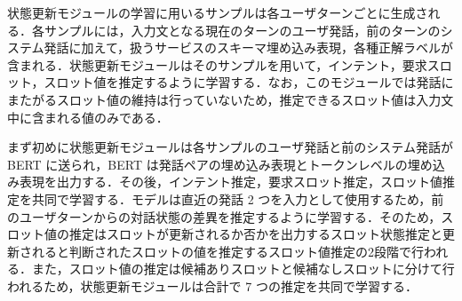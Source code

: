 状態更新モジュールの学習に用いるサンプルは各ユーザターンごとに生成される．各サンプルには，入力文となる現在のターンのユーザ発話，前のターンのシステム発話に加えて，扱うサービスのスキーマ埋め込み表現，各種正解ラベルが含まれる．状態更新モジュールはそのサンプルを用いて，インテント，要求スロット，スロット値を推定するように学習する．なお，このモジュールでは発話にまたがるスロット値の維持は行っていないため，推定できるスロット値は入力文中に含まれる値のみである．
\par
まず初めに状態更新モジュールは各サンプルのユーザ発話と前のシステム発話が BERT に送られ，BERT は発話ペアの埋め込み表現とトークンレベルの埋め込み表現を出力する．その後，インテント推定，要求スロット推定，スロット値推定を共同で学習する．モデルは直近の発話 2 つを入力として使用するため，前のユーザターンからの対話状態の差異を推定するように学習する．そのため，スロット値の推定はスロットが更新されるか否かを出力するスロット状態推定と更新されると判断されたスロットの値を推定するスロット値推定の2段階で行われる．また，スロット値の推定は候補ありスロットと候補なしスロットに分けて行われるため，状態更新モジュールは合計で 7 つの推定を共同で学習する．
\par
